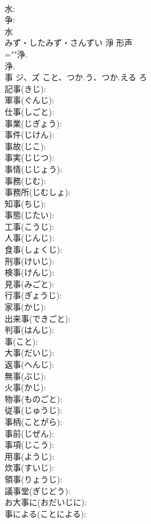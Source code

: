 \documentclass[8pt]{extreport}
\begin{document}
\begin{CJK}{UTF8}{min}
\\	水: 
\\	争: 
\\	水	
\\	みず・したみず・さんずい	淨	形声 
\\	=""浄.
\\	浄.
\\	事	ジ、ズ	こと、つか.う、つか.える	ろ	
\\	記事(きじ): 
\\	軍事(ぐんじ): 
\\	仕事(しごと): 
\\	事業(じぎょう): 
\\	事件(じけん): 
\\	事故(じこ): 
\\	事実(じじつ): 
\\	事情(じじょう): 
\\	事務(じむ): 
\\	事務所(じむしょ): 
\\	知事(ちじ): 
\\	事態(じたい): 
\\	工事(こうじ): 
\\	人事(じんじ): 
\\	食事(しょくじ): 
\\	刑事(けいじ): 
\\	検事(けんじ): 
\\	見事(みごと): 
\\	行事(ぎょうじ): 
\\	家事(かじ): 
\\	出来事(できごと): 
\\	判事(はんじ): 
\\	事(こと): 
\\	大事(だいじ): 
\\	返事(へんじ): 
\\	無事(ぶじ): 
\\	火事(かじ): 
\\	物事(ものごと): 
\\	従事(じゅうじ): 
\\	事柄(ことがら): 
\\	事前(じぜん): 
\\	事項(じこう): 
\\	用事(ようじ): 
\\	炊事(すいじ): 
\\	領事(りょうじ): 
\\	議事堂(ぎじどう): 
\\	お大事に(おだいじに): 
\\	事による(ことによる): 

\end{CJK}
\end{document}
